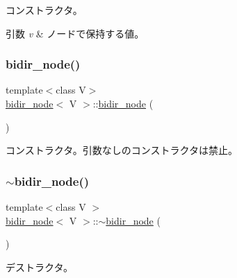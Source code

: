 コンストラクタ。 
\begin{DoxyParams}{引数}
{\em v} & ノードで保持する値。 \\
\hline
\end{DoxyParams}
\hypertarget{classbidir__node_ac26a6b2da36bc1dc71939a22a66fa101}{}\label{classbidir__node_ac26a6b2da36bc1dc71939a22a66fa101} 
\subsubsection{\texorpdfstring{bidir\+\_\+node()}{bidir\_node()}\hspace{0.1cm}{\footnotesize\ttfamily [2/4]}}
{\footnotesize\ttfamily template$<$class V$>$ \\
\hyperlink{classbidir__node}{bidir\+\_\+node}$<$ V $>$\+::\hyperlink{classbidir__node}{bidir\+\_\+node} (\begin{DoxyParamCaption}{ }\end{DoxyParamCaption})\hspace{0.3cm}{\ttfamily [delete]}}

コンストラクタ。引数なしのコンストラクタは禁止。 \hypertarget{classbidir__node_a73267f07aa67bd4488fa684f1c5303b3}{}\label{classbidir__node_a73267f07aa67bd4488fa684f1c5303b3} 
\subsubsection{\texorpdfstring{$\sim$bidir\+\_\+node()}{~bidir\_node()}}
{\footnotesize\ttfamily template$<$class V $>$ \\
\hyperlink{classbidir__node}{bidir\+\_\+node}$<$ V $>$\+::$\sim$\hyperlink{classbidir__node}{bidir\+\_\+node} (\begin{DoxyParamCaption}{ }\end{DoxyParamCaption})\hspace{0.3cm}{\ttfamily [virtual]}}

デストラクタ。 \hypertarget{classbidir__node_a72f9a152c3e7003b34b63de3c4bf3387}{}\label{classbidir__node_a72f9a152c3e7003b34b63de3c4bf3387} 
